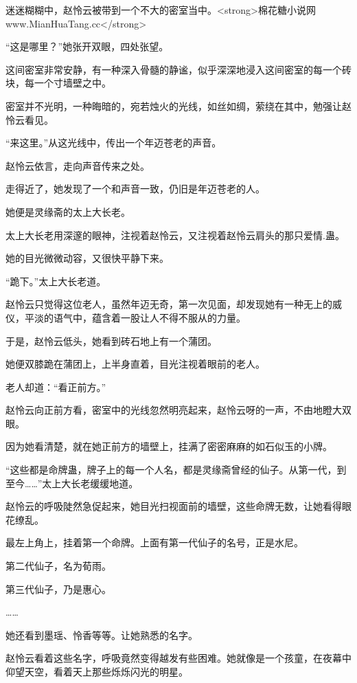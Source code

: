 
\begin{this_body}

迷迷糊糊中，赵怜云被带到一个不大的密室当中。<strong>棉花糖小说网www.MianHuaTang.cc</strong>

“这是哪里？”她张开双眼，四处张望。

这间密室非常安静，有一种深入骨髓的静谧，似乎深深地浸入这间密室的每一个砖块，每一个寸墙壁之中。

密室并不光明，一种晦暗的，宛若烛火的光线，如丝如绸，萦绕在其中，勉强让赵怜云看见。

“来这里。”从这光线中，传出一个年迈苍老的声音。

赵怜云依言，走向声音传来之处。

走得近了，她发现了一个和声音一致，仍旧是年迈苍老的人。

她便是灵缘斋的太上大长老。

太上大长老用深邃的眼神，注视着赵怜云，又注视着赵怜云肩头的那只爱情.蛊。

她的目光微微动容，又很快平静下来。

“跪下。”太上大长老道。

赵怜云只觉得这位老人，虽然年迈无奇，第一次见面，却发现她有一种无上的威仪，平淡的语气中，蕴含着一股让人不得不服从的力量。

于是，赵怜云低头，她看到砖石地上有一个蒲团。

她便双膝跪在蒲团上，上半身直着，目光注视着眼前的老人。

老人却道：“看正前方。”

赵怜云向正前方看，密室中的光线忽然明亮起来，赵怜云呀的一声，不由地瞪大双眼。

因为她看清楚，就在她正前方的墙壁上，挂满了密密麻麻的如石似玉的小牌。

“这些都是命牌蛊，牌子上的每一个人名，都是灵缘斋曾经的仙子。从第一代，到至今……”太上大长老缓缓地道。

赵怜云的呼吸陡然急促起来，她目光扫视面前的墙壁，这些命牌无数，让她看得眼花缭乱。

最左上角上，挂着第一个命牌。上面有第一代仙子的名号，正是水尼。

第二代仙子，名为荀雨。

第三代仙子，乃是惠心。

……

她还看到墨瑶、怜香等等。让她熟悉的名字。

赵怜云看着这些名字，呼吸竟然变得越发有些困难。她就像是一个孩童，在夜幕中仰望天空，看着天上那些烁烁闪光的明星。


\end{this_body}
